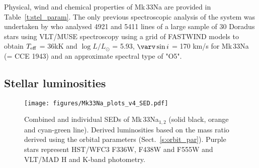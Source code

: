 \documentclass[fleqn,usenatbib]{mnras}
\begin{document}

Physical, wind and chemical properties of Mk\,33Na are provided in Table~\ref{t:stel_param}. The only previous spectroscopic analysis of the system was undertaken by \cite{castro2021} who analysed  4921 and  5411 lines of a large sample of 30 Doradus stars using VLT/MUSE spectroscopy \citep[CCE]{castro2018} using a grid of FASTWIND models to obtain $T_{\rm eff}$ = 36kK and $\log L/L_{\odot}$ = 5.93, $\varv \sin i$ = 170 km/s for Mk\,33Na (= CCE 1943) and an approximate spectral type of "O5".

\subsection{Stellar luminosities}\label{s:lum}

\begin{figure*}	
	\texttt{[image: figures/Mk33Na\_plots\_v4\_SED.pdf]}
    \caption{Combined and individual SEDs of Mk\,33Na$_{1,2}$ (solid black, orange and cyan-green line). Derived luminosities based on the mass ratio derived using the orbital parameters (Sect.~\ref{s:orbit_par}). Purple stars represent HST/WFC3 F336W, F438W and F555W and VLT/MAD H and K-band photometry.\label{f:sed}}
\end{figure*}
\end{document}
